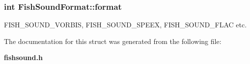 \subsubsection[{format}]{\setlength{\rightskip}{0pt plus 5cm}int {\bf \-Fish\-Sound\-Format\-::format}}\label{structFishSoundFormat_ad8e6fadc27abace836321a7f92971c2b}


\-F\-I\-S\-H\-\_\-\-S\-O\-U\-N\-D\-\_\-\-V\-O\-R\-B\-I\-S, \-F\-I\-S\-H\-\_\-\-S\-O\-U\-N\-D\-\_\-\-S\-P\-E\-E\-X, \-F\-I\-S\-H\-\_\-\-S\-O\-U\-N\-D\-\_\-\-F\-L\-A\-C etc. 



\-The documentation for this struct was generated from the following file\-:\begin{DoxyCompactItemize}
\item 
{\bf fishsound.\-h}\end{DoxyCompactItemize}
